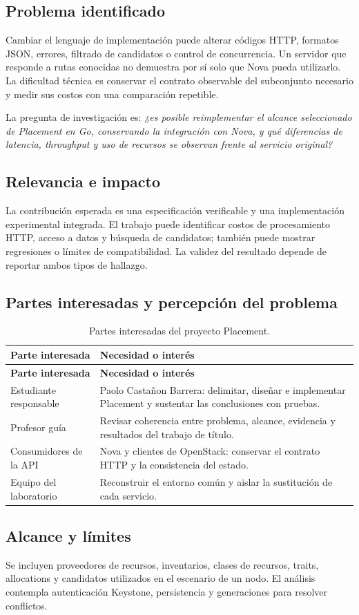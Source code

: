 \documentclass[12pt,a4paper]{article}
\newcommand{\reporttable}[4]{\begingroup\small\setlength{\LTpre}{8pt}\setlength{\LTpost}{8pt}\setlength{\tabcolsep}{4pt}\renewcommand{\arraystretch}{1.15}
\begin{longtable}{#2}\caption{#1}\\\toprule #3\\\midrule\endfirsthead
\toprule #3\\\midrule\endhead\bottomrule\endfoot #4\end{longtable}\endgroup}
\begin{document}
\subsection{Problema identificado}
Cambiar el lenguaje de implementación puede alterar códigos HTTP, formatos JSON, errores, filtrado de candidatos o control de concurrencia. Un servidor que responde a rutas conocidas no demuestra por sí solo que Nova pueda utilizarlo. La dificultad técnica es conservar el contrato observable del subconjunto necesario y medir sus costos con una comparación repetible.

La pregunta de investigación es: \textit{¿es posible reimplementar el alcance seleccionado de Placement en Go, conservando la integración con Nova, y qué diferencias de latencia, throughput y uso de recursos se observan frente al servicio original?}

\subsection{Relevancia e impacto}
La contribución esperada es una especificación verificable y una implementación experimental integrada. El trabajo puede identificar costos de procesamiento HTTP, acceso a datos y búsqueda de candidatos; también puede mostrar regresiones o límites de compatibilidad. La validez del resultado depende de reportar ambos tipos de hallazgo.

\subsection{Partes interesadas y percepción del problema}
\reporttable{Partes interesadas del proyecto Placement.}{>{\raggedright\arraybackslash}p{3.6cm}>{\raggedright\arraybackslash}p{11.4cm}}{\textbf{Parte interesada}&\textbf{Necesidad o interés}}{
Estudiante responsable&Paolo Castañon Barrera: delimitar, diseñar e implementar Placement y sustentar las conclusiones con pruebas.\\*
Profesor guía&Revisar coherencia entre problema, alcance, evidencia y resultados del trabajo de título.\\*
Consumidores de la API&Nova y clientes de OpenStack: conservar el contrato HTTP y la consistencia del estado.\\*
Equipo del laboratorio&Reconstruir el entorno común y aislar la sustitución de cada servicio.\\}

\subsection{Alcance y límites}
Se incluyen proveedores de recursos, inventarios, clases de recursos, traits, allocations y candidatos utilizados en el escenario de un nodo. El análisis contempla autenticación Keystone, persistencia y generaciones para resolver conflictos.
\end{document}
